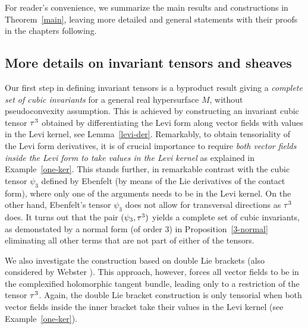 \documentclass[12pt]{amsart}
\begin{document}
For reader's convenience,
we summarize the main results and constructions
in Theorem~\ref{main},
leaving more detailed and general statements
with their proofs in the chapters following.



\subsection{More details on invariant tensors and sheaves}
Our first step in defining invariant tensors is a byproduct result 
giving a {\em complete set of cubic invariants}
for a general real hypersurface $M$, without pseudoconvexity assumption.
This is achieved by constructing an invariant cubic tensor $\tau^3$
obtained by differentiating the Levi form along vector fields
with values in the Levi kernel, see Lemma~\ref{levi-der}.
Remarkably, to obtain tensoriality of the Levi form derivatives, 
it is of crucial importance to require
{\em both vector fields inside the Levi form to take values in the Levi kernel}
as explained in Example~\ref{one-ker}.
This stands further, in remarkable contrast with the cubic tensor $\psi_3$
defined by Ebenfelt \cite{E-jdg}
(by means of the Lie derivatives of the contact form),
where only one of the arguments needs to be in the Levi kernel.
%
On the other hand, Ebenfelt's tensor $\psi_3$
does not allow for transversal directions as $\tau^3$ does.
It turns out that the pair $(\psi_3, \tau^3)$ yields
a complete set of cubic invariants, 
as demonstated by a normal form 
(of order $3$)
in Proposition~\ref{3-normal} eliminating all other terms
that are not part of either of the tensors.

We also investigate the construction based on double Lie brackets
(also considered by Webster \cite{W}).
This approach, however, forces all vector fields
to be in the complexified holomorphic tangent bundle,
leading only to a restriction of the tensor $\tau^3$.
Again, the double Lie bracket construction
is only tensorial when both vector fields inside the inner bracket
take their values in the Levi kernel (see Example~\ref{one-ker}).
\end{document}
